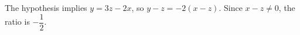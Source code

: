 The hypothesis implies $y=3z-2x$, so $y-z=-2(x-z)$. Since $x-z\ne0$, the ratio is $\boxed{-\dfrac{1}{2}}$.
